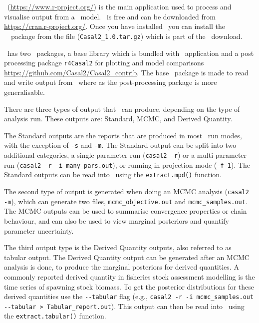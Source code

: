 \section{ \label{sec:PostProcessing}}

\R\ (\url{https://www.r-project.org/}) is the main application used to process and visualise output from a \CNAME\ model. \R\ is free and can be downloaded from \url{https://cran.r-project.org/}. Once you have installed \R\ you can install the \cname\ \R\ package from the file (\texttt{Casal2\_1.0.tar.gz}) which is part of the \CNAME\ download.

\CNAME\ has two \R\ packages, a base library which is bundled with \CNAME\ application and a post processing package \texttt{r4Casal2} for plotting and model comparisons \url{https://github.com/Casal2/Casal2_contrib}. The base \R\ package is made to read and write output from \CNAME\ where as the post-processing package is more generalisable. 

There are three types of output that \CNAME\ can produce, depending on the type of analysis run. These outputs are: Standard, MCMC, and Derived Quantity.

The Standard outputs are the reports that are produced in most \CNAME\ run modes, with the exception of \texttt{-s} and \texttt{-m}. The Standard output can be split into two additional categories, a single parameter run (\texttt{casal2 -r}) or a multi-parameter run (\texttt{casal2 -r -i many\_pars.out}), or running in projection mode (\texttt{-f 1}). The Standard outputs can be read into \R\ using the \texttt{extract.mpd()} function.

The second type of output is generated when doing an MCMC analysis (\texttt{casal2 -m}), which can generate two files, \texttt{mcmc\_objective.out} and \texttt{mcmc\_samples.out}. The MCMC outputs can be used to summarise convergence properties or chain behaviour, and can also be used to view marginal posteriors and quantify parameter uncertainty.

The third output type is the Derived Quantity outputs, also referred to as tabular output. The Derived Quantity output can be generated after an MCMC analysis is done, to produce the marginal posteriors for derived quantities. A commonly reported derived quantity in fisheries stock assessment modelling is the time series of spawning stock biomass. To get the posterior distributions for these derived quantities use the \texttt{-{}-tabular} flag (e.g., \texttt{casal2 -r -i mcmc\_samples.out -{}-tabular > Tabular\_report.out}). This output can then be read into \R\ using the \texttt{extract.tabular()} function.

